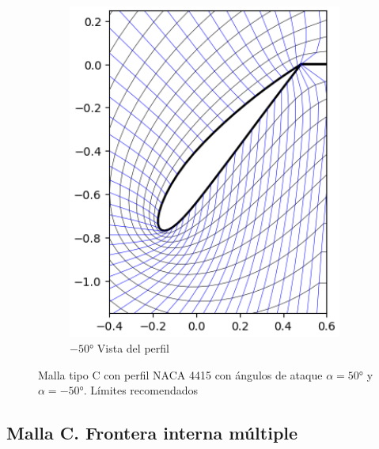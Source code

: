 \documentclass[letterpaper, openright, 12pt]{book}
\begin{document}
\begin{figure}[htbp!]
\begin{subfigure}[c]{0.45\textwidth}
            \includegraphics[keepaspectratio,
                width=0.99\textwidth]{./img/naca4415_c_-50}
            \caption{$-50\si{\degree}$ Vista del perfil}
            \label{fig:naca4415_c_-50}
        \end{subfigure}
        \caption[Malla tipo C. Vista de los límites recomendados]{Malla tipo C
            con perfil NACA 4415 con ángulos de ataque
            $\alpha = 50\si{\degree}$ y $\alpha = -50\si{\degree}$. Límites
            recomendados}
            \label{fig:naca4415_c_detail}
    \end{figure}

    \subsection{Malla C. Frontera interna múltiple}
\end{document}
